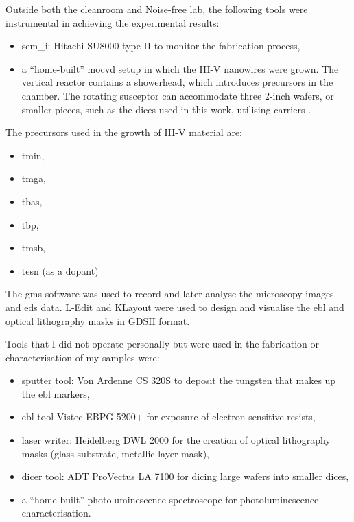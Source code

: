 Outside both the cleanroom and Noise-free lab, the following tools were instrumental in achieving the experimental results:
\begin{itemize}
    \item \acf{sem_i}: Hitachi SU8000 type II to monitor the fabrication process,
    \item a “home-built” \acf{mocvd} setup in which the III-V nanowires were grown. The vertical reactor contains a showerhead, which introduces precursors in the chamber. The rotating susceptor can accommodate three 2-inch wafers, or smaller pieces, such as the  dices used in this work, utilising carriers \cite{Brugnolotto2023}.
\end{itemize}
\par
The precursors used in the growth of III-V material are:
\begin{itemize}
    \item \acf{tmin},
    \item \acf{tmga},
    \item \acf{tbas},
    \item \acf{tbp},
    \item \acf{tmsb},
    \item \acf{tesn} (as a dopant)
\end{itemize}

The \acf{gms} software was used to record and later analyse the microscopy images and \acs{eds} data. L-Edit and KLayout were used to design and visualise the \acf{ebl} and optical lithography masks in GDSII format. 
\par 
Tools that I did not operate personally but were used in the fabrication or characterisation of my samples were:
\begin{itemize}
    \item sputter tool: Von Ardenne CS 320S to deposit the tungsten that makes up the \acl{ebl} markers,
    \item \acl{ebl} tool Vistec EBPG 5200+ for exposure of electron-sensitive resists,
    \item laser writer: Heidelberg DWL 2000 for the creation of optical lithography masks (glass substrate, metallic layer mask),
    \item dicer tool: ADT ProVectus LA 7100 for dicing large wafers into smaller dices,
    \item a “home-built” photoluminescence spectroscope for photoluminescence characterisation.
\end{itemize}